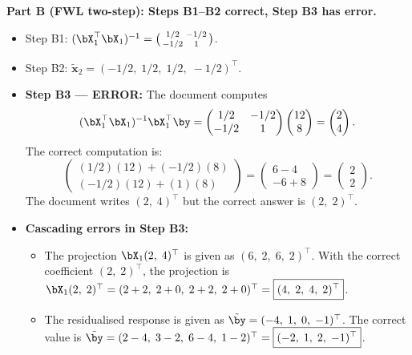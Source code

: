 \medskip
\noindent\textbf{Part B (FWL two-step): Steps B1--B2 correct, Step B3 has error.}
\begin{itemize}[nosep]
  \item Step B1: $(\bX_1^\top\bX_1)^{-1} = \bigl(\begin{smallmatrix}1/2&-1/2\\-1/2&1\end{smallmatrix}\bigr)$. \checkmark
  \item Step B2: $\tilde{\bm{x}}_2 = (-1/2,\;1/2,\;1/2,\;-1/2)^\top$. \checkmark
  \item[\bfseries !] \textbf{Step B3 --- ERROR:}
        The document computes
        \[
          (\bX_1^\top\bX_1)^{-1}\bX_1^\top\by
          = \begin{pmatrix}1/2&-1/2\\-1/2&1\end{pmatrix}
            \begin{pmatrix}12\\8\end{pmatrix}
          = \begin{pmatrix}2\\4\end{pmatrix}.
        \]
        The correct computation is:
        \[
          \begin{pmatrix}(1/2)(12)+(-1/2)(8)\\(-1/2)(12)+(1)(8)\end{pmatrix}
          = \begin{pmatrix}6-4\\-6+8\end{pmatrix}
          = \begin{pmatrix}2\\2\end{pmatrix}.
        \]
        The document writes $(2,\;4)^\top$ but the correct answer is
        $\boxed{(2,\;2)^\top}$.

  \item[\bfseries !] \textbf{Cascading errors in Step B3:}
        \begin{itemize}[nosep]
          \item The projection $\bX_1(2,\;4)^\top$ is given as $(6,\;2,\;6,\;2)^\top$.
                With the correct coefficient $(2,\;2)^\top$, the projection is
                $\bX_1(2,\;2)^\top = (2+2,\;2+0,\;2+2,\;2+0)^\top
                = \boxed{(4,\;2,\;4,\;2)^\top}$.
          \item The residualised response is given as
                $\tilde{\by} = (-4,\;1,\;0,\;-1)^\top$.
                The correct value is
                $\tilde{\by} = (2-4,\;3-2,\;6-4,\;1-2)^\top
                = \boxed{(-2,\;1,\;2,\;-1)^\top}$.
        \end{itemize}


\end{itemize}
